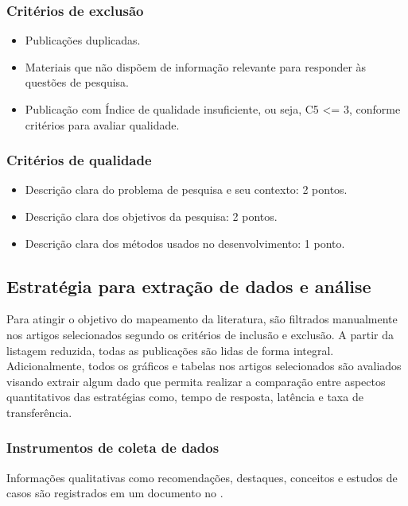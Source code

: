 \subsubsection{Critérios de exclusão}
\label{section:criterios_exclusao}
\begin{itemize}
    \item Publicações duplicadas.
    \item Materiais que não dispõem de informação relevante para responder às questões de pesquisa.
    \item Publicação com Índice de qualidade insuficiente, ou seja, C5 <= 3, conforme critérios para avaliar qualidade.
\end{itemize}

\subsubsection{Critérios de qualidade}
\begin{itemize}
    \item Descrição clara do problema de pesquisa e seu contexto: 2 pontos.
    \item Descrição clara dos objetivos da pesquisa: 2 pontos.
    \item Descrição clara dos métodos usados no desenvolvimento: 1 ponto.
\end{itemize}

\subsection{Estratégia para extração de dados e análise}
Para atingir o objetivo do mapeamento da literatura, são filtrados manualmente nos artigos selecionados segundo os critérios de inclusão e exclusão. A partir da listagem reduzida, todas as publicações são lidas de forma integral.
Adicionalmente, todos os gráficos e tabelas nos artigos selecionados são avaliados visando extrair algum dado que permita realizar a comparação entre aspectos quantitativos das estratégias como, tempo de resposta, latência e taxa de transferência.

\subsubsection{Instrumentos de coleta de dados}
Informações qualitativas como recomendações, destaques, conceitos e estudos de casos são registrados em um documento no . 

